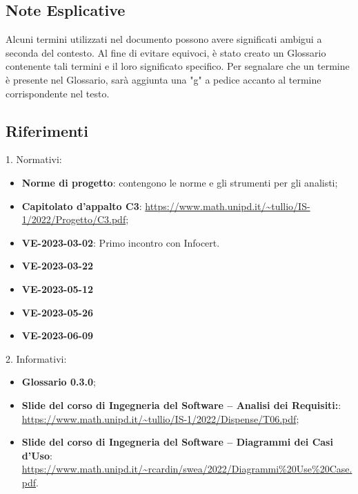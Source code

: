 \subsection{Note Esplicative}
Alcuni termini utilizzati nel documento possono avere significati ambigui a seconda del contesto. Al fine di evitare equivoci, è stato creato un Glossario contenente tali termini 
e il loro significato specifico. Per segnalare che un termine è presente nel Glossario, sarà aggiunta una "g" a pedice accanto al termine corrispondente nel testo.

\subsection{Riferimenti}
1. Normativi: 
\begin{itemize}
    \item \textbf{Norme di progetto}: contengono le norme e gli strumenti per gli analisti;
    \item \textbf{Capitolato d’appalto C3}: \url{https://www.math.unipd.it/~tullio/IS-1/2022/Progetto/C3.pdf};
    \item \textbf{VE-2023-03-02}: Primo incontro con Infocert.
    \item \textbf{VE-2023-03-22}
    \item \textbf{VE-2023-05-12}
    \item \textbf{VE-2023-05-26}
    \item \textbf{VE-2023-06-09}
\end{itemize}

2. Informativi: 
\begin{itemize}
    \item \textbf{Glossario 0.3.0};
    \item \textbf{Slide del corso di Ingegneria del Software – Analisi dei Requisiti:}: \url{https://www.math.unipd.it/~tullio/IS-1/2022/Dispense/T06.pdf};
    \item \textbf{Slide del corso di Ingegneria del Software – Diagrammi dei Casi d’Uso}: \url{https://www.math.unipd.it/~rcardin/swea/2022/Diagrammi%20Use%20Case.pdf}.
\end{itemize}